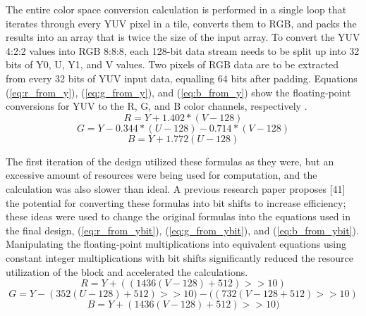 \documentclass{article}
\newcounter{subsubsubsection}[subsubsection]
\begin{document}
                    The entire color space conversion calculation is performed in a single loop that iterates through every YUV pixel in a tile, converts them to RGB, and packs the results into an array that is twice the size of the input array. To convert the YUV 4:2:2 values into RGB 8:8:8, each 128-bit data stream needs to be split up into 32 bits of Y0, U, Y1, and V values. Two pixels of RGB data are to be extracted from every 32 bits of YUV input data, equalling 64 bits after padding. Equations (\ref{eq:r_from_y}), (\ref{eq:g_from_y}), and (\ref{eq:b_from_y}) show the floating-point conversions for YUV to the R, G, and B color channels, respectively \cite{yang_fast_2007}.
                    \begin{equation}R=Y+1.402*(V-128)\label{eq:r_from_y}\end{equation}
                    \begin{equation}G = Y-0.344*(U-128)-0.714*(V-128) \label{eq:g_from_y}\end{equation}
                    \begin{equation}B = Y+1.772(U-128)\label{eq:b_from_y}\end{equation}

                    \par The first iteration of the design utilized these formulas as they were, but an excessive amount of resources were being used for computation, and the calculation was also slower than ideal. A previous research paper proposes [41] the potential for converting these formulas into bit shifts to increase efficiency; these ideas were used to change the original formulas into the equations used in the final design, (\ref{eq:r_from_ybit}), (\ref{eq:g_from_ybit}), and (\ref{eq:b_from_ybit}). Manipulating the floating-point multiplications into equivalent equations using constant integer multiplications with bit shifts significantly reduced the resource utilization of the block and accelerated the calculations. 
                    \begin{equation}R = Y+((1436(V-128)+512)>>10)  \label{eq:r_from_ybit} \end{equation}
                    \begin{equation}G = Y-(352(U-128)+512)>>10)-((732(V-128+512)>>10) \label{eq:g_from_ybit} \end{equation}
                    \begin{equation}B = Y+(1436(V-128)+512)>>10)   \label{eq:b_from_ybit} \end{equation}
\end{document}
